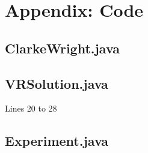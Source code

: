 \documentclass[conference]{acmsiggraph}
\begin{document}
\section{Appendix: Code}
\subsection{ClarkeWright.java}
%

\vfill

\subsection{VRSolution.java}
Lines 20 to 28
%

\subsection{Experiment.java}
%
\end{document}
